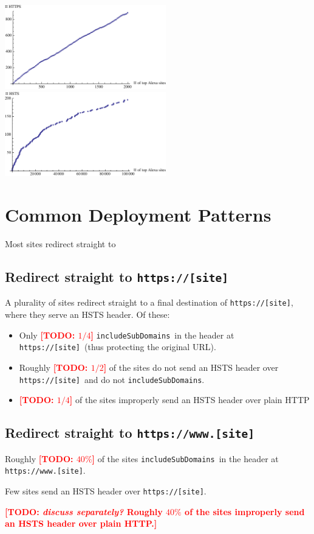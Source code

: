 \documentclass[conference]{./IEEEtran}
\newcommand{\todo}[1]{\textcolor{red}{\textbf{[TODO: #1]}}}
\newcommand{\td}[2]{\textcolor{red}{\textbf{[TODO: {\it{#1}} #2]}}}
\newcommand{\site}[1]{\texttt{#1}}
\newcommand{\code}[1]{\texttt{#1}}
\newcommand{\iSD}{{\code{includeSubDomains}}}
\newcommand{\genericsite}{[site]}
\newcommand{\s}{{\site{https://\genericsite}}}
\newcommand{\sw}{{\site{https://www.\genericsite}}}
\theoremstyle{plain}
\begin{document}
\begin{center}
\includegraphics[width=70mm]{alexa_https.pdf}
\includegraphics[width=70mm]{alexa_hsts.pdf}
\end{center}

\section{Common Deployment Patterns}

Most sites redirect straight to 

\subsection{Redirect straight to \s}

A plurality of sites redirect straight to a final destination of \s, where they serve an HSTS header. Of these:

\begin{itemize}
\item Only \todo{$1/4$} \iSD~in the header at \s~(thus protecting the original URL).
\item Roughly \todo{$1/2$} of the sites do not send an HSTS header over \s~and do not \iSD.
\item \todo{$1/4$} of the sites improperly send an HSTS header over plain HTTP%
\end{itemize}

\subsection{Redirect straight to \sw}

\item Roughly \todo{$40\%$} of the sites \iSD~in the header at \sw.
\item Few sites send an HSTS header over \s.
\item \td{discuss separately?}{Roughly $40\%$ of the sites improperly send an HSTS header over plain HTTP.}
\end{document}
